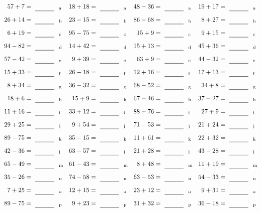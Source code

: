 \documentclass
[
  draft    = true,
  fontsize = 11pt,
  parskip  = half-
]
{scrartcl}
\begin{document}
\clearpage
\begin{align*}
    \pline{57+7}&=\rline{a}
  & \pline{18+18}&=\rline{a}
  & \pline{48-36}&=\rline{a}
  & \pline{19+17}&=\rline{a} \\[1ex]
    \pline{26+14}&=\rline{b}
  & \pline{23-15}&=\rline{b}
  & \pline{86-68}&=\rline{b}
  & \pline{8+27}&=\rline{b} \\[1ex]
    \pline{6+19}&=\rline{c}
  & \pline{95-75}&=\rline{c}
  & \pline{15+9}&=\rline{c}
  & \pline{9+15}&=\rline{c} \\[1ex]
    \pline{94-82}&=\rline{d}
  & \pline{14+42}&=\rline{d}
  & \pline{15+13}&=\rline{d}
  & \pline{45+36}&=\rline{d} \\[1ex]
    \pline{57-42}&=\rline{e}
  & \pline{9+39}&=\rline{e}
  & \pline{63+9}&=\rline{e}
  & \pline{44-32}&=\rline{e} \\[1ex]
    \pline{15+33}&=\rline{f}
  & \pline{26-18}&=\rline{f}
  & \pline{12+16}&=\rline{f}
  & \pline{17+13}&=\rline{f} \\[1ex]
    \pline{8+34}&=\rline{g}
  & \pline{36-32}&=\rline{g}
  & \pline{68-52}&=\rline{g}
  & \pline{34+8}&=\rline{g} \\[1ex]
    \pline{18+6}&=\rline{h}
  & \pline{15+9}&=\rline{h}
  & \pline{67-46}&=\rline{h}
  & \pline{37-27}&=\rline{h} \\[1ex]
    \pline{11+16}&=\rline{i}
  & \pline{33+12}&=\rline{i}
  & \pline{88-76}&=\rline{i}
  & \pline{27+9}&=\rline{i} \\[1ex]
    \pline{29+25}&=\rline{j}
  & \pline{9+54}&=\rline{j}
  & \pline{71-53}&=\rline{j}
  & \pline{21+24}&=\rline{j} \\[1ex]
    \pline{89-75}&=\rline{k}
  & \pline{35-15}&=\rline{k}
  & \pline{11+61}&=\rline{k}
  & \pline{22+32}&=\rline{k} \\[1ex]
    \pline{42-36}&=\rline{l}
  & \pline{63-57}&=\rline{l}
  & \pline{21+28}&=\rline{l}
  & \pline{43-28}&=\rline{l} \\[1ex]
    \pline{65-49}&=\rline{m}
  & \pline{61-43}&=\rline{m}
  & \pline{8+48}&=\rline{m}
  & \pline{11+19}&=\rline{m} \\[1ex]
    \pline{35-26}&=\rline{n}
  & \pline{74-58}&=\rline{n}
  & \pline{63-53}&=\rline{n}
  & \pline{54-33}&=\rline{n} \\[1ex]
    \pline{7+25}&=\rline{o}
  & \pline{12+15}&=\rline{o}
  & \pline{23+12}&=\rline{o}
  & \pline{9+31}&=\rline{o} \\[1ex]
    \pline{89-75}&=\rline{p}
  & \pline{9+23}&=\rline{p}
  & \pline{31+32}&=\rline{p}
  & \pline{36-18}&=\rline{p}
\end{align*}
\end{document}
